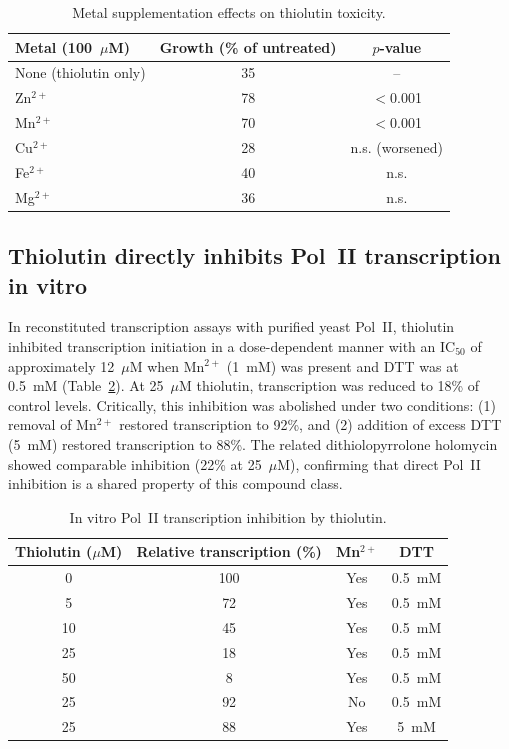 \documentclass[11pt]{article}
\begin{document}
\begin{table}[ht]
\centering
\caption{Metal supplementation effects on thiolutin toxicity.}
\label{tab:metals}
\begin{tabular}{lcc}
\toprule
\textbf{Metal (100~$\mu$M)} & \textbf{Growth (\% of untreated)} & \textbf{$p$-value} \\
\midrule
None (thiolutin only) & 35 & -- \\
Zn$^{2+}$ & 78 & $<$0.001 \\
Mn$^{2+}$ & 70 & $<$0.001 \\
Cu$^{2+}$ & 28 & n.s. (worsened) \\
Fe$^{2+}$ & 40 & n.s. \\
Mg$^{2+}$ & 36 & n.s. \\
\bottomrule
\end{tabular}
\end{table}

\subsection{Thiolutin directly inhibits Pol~II transcription in vitro}

In reconstituted transcription assays with purified yeast Pol~II, thiolutin inhibited transcription initiation in a dose-dependent manner with an IC$_{50}$ of approximately 12~$\mu$M when Mn$^{2+}$ (1~mM) was present and DTT was at 0.5~mM (Table~\ref{tab:invitro}). At 25~$\mu$M thiolutin, transcription was reduced to 18\% of control levels. Critically, this inhibition was abolished under two conditions: (1) removal of Mn$^{2+}$ restored transcription to 92\%, and (2) addition of excess DTT (5~mM) restored transcription to 88\%. The related dithiolopyrrolone holomycin showed comparable inhibition (22\% at 25~$\mu$M), confirming that direct Pol~II inhibition is a shared property of this compound class.

\begin{table}[ht]
\centering
\caption{In vitro Pol~II transcription inhibition by thiolutin.}
\label{tab:invitro}
\begin{tabular}{cccc}
\toprule
\textbf{Thiolutin ($\mu$M)} & \textbf{Relative transcription (\%)} & \textbf{Mn$^{2+}$} & \textbf{DTT} \\
\midrule
0 & 100 & Yes & 0.5~mM \\
5 & 72 & Yes & 0.5~mM \\
10 & 45 & Yes & 0.5~mM \\
25 & 18 & Yes & 0.5~mM \\
50 & 8 & Yes & 0.5~mM \\
25 & 92 & No & 0.5~mM \\
25 & 88 & Yes & 5~mM \\
\bottomrule
\end{tabular}
\end{table}
\end{document}
